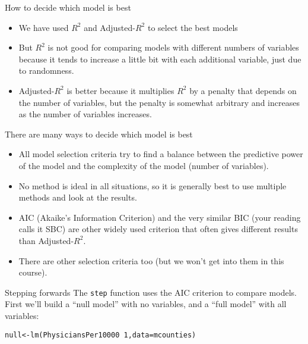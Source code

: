 \documentclass{beamer}\usepackage[]{graphicx}\usepackage[]{color}
\makeatletter
\newcommand{\hlnum}[1]{\textcolor[rgb]{0.824,0.412,0.118}{#1}}%
\newcommand{\hlopt}[1]{\textcolor[rgb]{1,0.894,0.769}{#1}}%
\newcommand{\hlstd}[1]{\textcolor[rgb]{1,0.894,0.769}{#1}}%
\newcommand{\hlkwb}[1]{\textcolor[rgb]{0.804,0.776,0.451}{#1}}%
\newcommand{\hlkwc}[1]{\textcolor[rgb]{0.78,0.941,0.545}{#1}}%
\newcommand{\hlkwd}[1]{\textcolor[rgb]{1,0.78,0.769}{#1}}%
\newenvironment{kframe}{%
 \def\at@end@of@kframe{}%
 \ifinner\ifhmode%
  \def\at@end@of@kframe{\end{minipage}}%
  \begin{minipage}{\columnwidth}%
 \fi\fi%
 \def\FrameCommand##1{\hskip\@totalleftmargin \hskip-\fboxsep
 \colorbox{shadecolor}{##1}\hskip-\fboxsep
     \hskip-\linewidth \hskip-\@totalleftmargin \hskip\columnwidth}%
 \MakeFramed {\advance\hsize-\width
   \@totalleftmargin\z@ \linewidth\hsize
   \@setminipage}}%
 {\par\unskip\endMakeFramed%
 \at@end@of@kframe}
\newenvironment{knitrout}{}{} %
\makeatother
\begin{document}
\begin{darkframes}
    \begin{frame}{How to decide which model is best}
      \begin{itemize}[<+->]
        \item We have used $R^2$ and Adjusted-$R^2$ to select the best models
        \item But $R^2$ is not good for comparing models with different numbers of variables because it tends to increase a little bit with each additional variable, just due to randomness.
        \item Adjusted-$R^2$ is better because it multiplies $R^2$ by a penalty that depends on the number of variables, but the penalty is somewhat arbitrary and increases as the number of variables increases.
      \end{itemize} 
    \end{frame}


    \begin{frame}{There are many ways to decide which model is best}
      \begin{itemize}[<+->]
        \item All model selection criteria try to find a balance between the \alert{predictive power of the model} and the \alert{complexity of the model} (number of variables).
        \item No method is ideal in all situations, so it is generally best to use multiple methods and look at the results.
        \item AIC (Akaike's Information Criterion) and the very similar BIC (your reading calls it SBC) are other widely used criterion that often gives different results than Adjusted-$R^2$.
        \item There are other selection criteria too (but we won't get into them in this course).
      \end{itemize} 
      \lc  %
    \end{frame}

    \begin{frame}[fragile]{Stepping forwards}
       The \texttt{step} function uses the AIC criterion to compare models. First we'll build a ``null model'' with no variables, and a ``full model'' with all variables:

      \fontsize{9}{9}\selectfont
\begin{knitrout}
\begin{kframe}
\begin{alltt}
\hlstd{null} \hlkwb{<-} \hlkwd{lm}\hlstd{(PhysiciansPer10000} \hlopt{~} \hlnum{1}\hlstd{,} \hlkwc{data}\hlstd{=mcounties)}


\end{alltt}
\end{kframe}
\end{knitrout}
\end{frame}
\end{darkframes}
\end{document}
